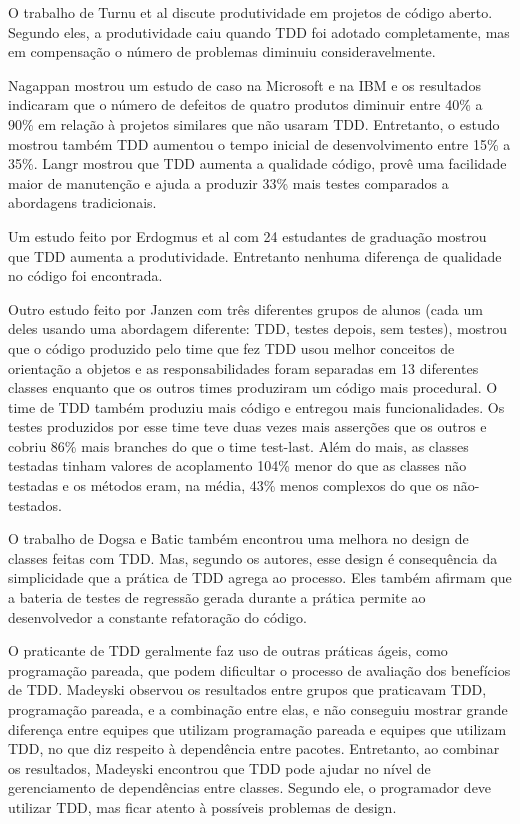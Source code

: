 O trabalho de Turnu et al \cite{turnu-tdd-opensouce} discute produtividade em
projetos de código aberto. Segundo eles, a produtividade caiu quando TDD foi
adotado completamente, mas em compensação o número de problemas diminuiu 
consideravelmente.

Nagappan \cite{nagappan-ms} mostrou um estudo de caso na Microsoft e na IBM e os
resultados indicaram que o número de defeitos de quatro produtos diminuir entre 
40\% a 90\% em relação à projetos similares que não usaram TDD. Entretanto, o 
estudo mostrou também TDD aumentou o tempo inicial de desenvolvimento entre 15\%
a 35\%. Langr \cite{langr} mostrou que TDD aumenta a qualidade código, provê uma 
facilidade maior de manutenção e ajuda a produzir 33\% mais testes comparados  a
abordagens tradicionais.

Um estudo feito por Erdogmus et al \cite{erdogmus-morisio} com 24 estudantes de
graduação mostrou que TDD aumenta a produtividade. Entretanto nenhuma diferença 
de qualidade no código foi encontrada.

Outro estudo feito por Janzen \cite{janzen-saiedian} com três diferentes grupos
de alunos (cada um deles usando uma abordagem diferente: TDD, testes depois, sem
testes), mostrou que o código produzido pelo time que fez TDD usou melhor
conceitos de orientação a objetos e as responsabilidades foram separadas em 13 
diferentes classes enquanto que os outros times produziram um código mais
procedural. O time de TDD também produziu mais código e entregou mais
funcionalidades. Os testes produzidos por esse time teve duas vezes mais
asserções que os outros e cobriu 86\% mais branches do que o time test-last. 
Além do mais, as classes testadas tinham valores de acoplamento 104\% menor do 
que as classes não testadas e os métodos eram, na média, 43\% menos complexos 
do que os não-testados.

O trabalho de Dogsa e Batic \cite{dogsa-batic} também encontrou uma melhora no
design de classes feitas com TDD. Mas, segundo os autores, esse design é 
consequência da simplicidade que a prática de TDD agrega ao processo. Eles
também  afirmam que a bateria de testes de regressão gerada durante a prática 
permite ao desenvolvedor a constante refatoração do código.

O praticante de TDD geralmente faz uso de outras práticas ágeis, como
programação pareada, que podem dificultar o processo de avaliação dos benefícios
de TDD. Madeyski \cite{madeyski-package-dependencies} observou os resultados
entre grupos que praticavam TDD, programação pareada, e a combinação entre elas,
e não conseguiu mostrar grande diferença entre equipes que utilizam programação 
pareada e equipes que utilizam TDD, no que diz respeito à dependência entre 
pacotes. Entretanto, ao combinar os resultados, Madeyski encontrou que TDD pode 
ajudar no nível de gerenciamento de dependências entre classes. Segundo ele, o 
programador deve utilizar TDD, mas ficar atento à possíveis problemas de design.

